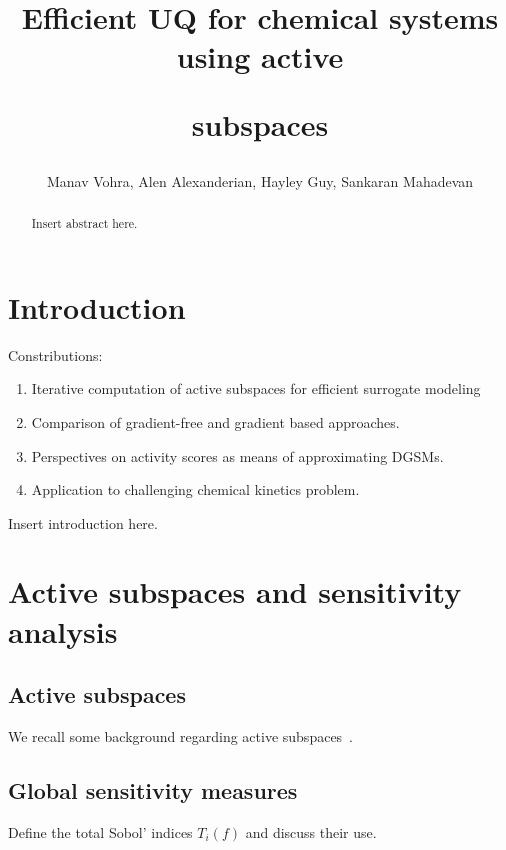\documentclass[11pt]{article}
\title{Efficient UQ for chemical systems using active 
\author{Manav Vohra, Alen Alexanderian, Hayley Guy, Sankaran Mahadevan}
subspaces}
\begin{document}
\maketitle



\begin{abstract}
Insert abstract here.
\end{abstract}

\tableofcontents
\section{Introduction}

Constributions:
\begin{enumerate}
\item Iterative computation of active subspaces for efficient surrogate modeling 
\item Comparison of gradient-free and gradient based approaches.
\item Perspectives on activity scores as means of approximating DGSMs.
\item Application to challenging chemical kinetics problem. 
\end{enumerate}
Insert introduction here.

\section{Active subspaces and sensitivity analysis}

\subsection{Active subspaces}
We recall some background regarding active subspaces~\cite{Constantine15}.
\subsection{Global sensitivity measures}
Define the total Sobol' indices $T_i(f)$ and discuss their use. 
\end{document}
